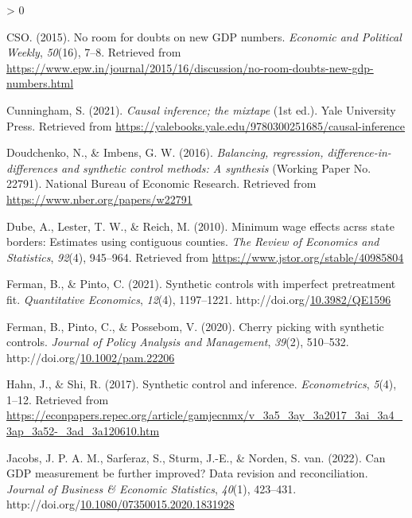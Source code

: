\documentclass[12pt,nobind, a4paper]{reedthesis}
\newlength{\cslhangindent}
\newenvironment{CSLReferences}[2] %
{%
	\setlength{\parindent}{0pt}
	\ifodd #1 \everypar{\setlength{\hangindent}{\cslhangindent}}\ignorespaces\fi
	\ifnum #2 > 0
	\setlength{\parskip}{#2\baselineskip}
	\fi
}%
{}
\begin{document}
\begin{CSLReferences}{1}{0}
 \leavevmode\hypertarget{ref-cso_no_2015}{}%
 CSO. (2015). No room for doubts on new {GDP} numbers. \emph{Economic and Political Weekly}, \emph{50}(16), 7--8. Retrieved from \url{https://www.epw.in/journal/2015/16/discussion/no-room-doubts-new-gdp-numbers.html}

 \leavevmode\hypertarget{ref-cunningham_causal_2021}{}%
 Cunningham, S. (2021). \emph{Causal inference; the mixtape} (1st ed.). Yale University Press. Retrieved from \url{https://yalebooks.yale.edu/9780300251685/causal-inference}

 \leavevmode\hypertarget{ref-doudchenko_balancing_2016}{}%
 Doudchenko, N., \& Imbens, G. W. (2016). \emph{Balancing, regression, difference-in-differences and synthetic control methods: A synthesis} (Working Paper No. 22791). National Bureau of Economic Research. Retrieved from \url{https://www.nber.org/papers/w22791}

 \leavevmode\hypertarget{ref-dube_minimum_2010}{}%
 Dube, A., Lester, T. W., \& Reich, M. (2010). Minimum wage effects acrss state borders: Estimates using contiguous counties. \emph{The Review of Economics and Statistics}, \emph{92}(4), 945--964. Retrieved from \url{https://www.jstor.org/stable/40985804}

 \leavevmode\hypertarget{ref-ferman_synthetic_2021}{}%
 Ferman, B., \& Pinto, C. (2021). Synthetic controls with imperfect pretreatment fit. \emph{Quantitative Economics}, \emph{12}(4), 1197--1221. http://doi.org/\href{https://doi.org/10.3982/QE1596}{10.3982/QE1596}

 \leavevmode\hypertarget{ref-ferman_cherry_2020}{}%
 Ferman, B., Pinto, C., \& Possebom, V. (2020). Cherry picking with synthetic controls. \emph{Journal of Policy Analysis and Management}, \emph{39}(2), 510--532. http://doi.org/\href{https://doi.org/10.1002/pam.22206}{10.1002/pam.22206}

 \leavevmode\hypertarget{ref-hahn_synthetic_2017}{}%
 Hahn, J., \& Shi, R. (2017). Synthetic control and inference. \emph{Econometrics}, \emph{5}(4), 1--12. Retrieved from \url{https://econpapers.repec.org/article/gamjecnmx/v_3a5_3ay_3a2017_3ai_3a4_3ap_3a52-_3ad_3a120610.htm}

 \leavevmode\hypertarget{ref-jacobs_can_2022}{}%
 Jacobs, J. P. A. M., Sarferaz, S., Sturm, J.-E., \& Norden, S. van. (2022). Can {GDP} measurement be further improved? Data revision and reconciliation. \emph{Journal of Business \& Economic Statistics}, \emph{40}(1), 423--431. http://doi.org/\href{https://doi.org/10.1080/07350015.2020.1831928}{10.1080/07350015.2020.1831928}


\end{CSLReferences}
\end{document}
